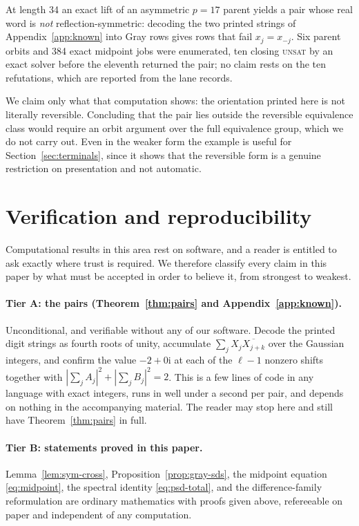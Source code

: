 \documentclass[11pt]{article}
\newcommand{\ii}{\mathrm{i}}
\begin{document}
At length 34 an exact lift of an asymmetric $p=17$ parent yields a pair whose
real word is \emph{not} reflection-symmetric: decoding the two printed strings
of Appendix~\ref{app:known} into Gray rows gives rows that fail $x_j=x_{-j}$.
Six parent orbits and 384 exact midpoint jobs were enumerated, ten closing
\textsc{unsat} by an exact solver before the eleventh returned the pair; no
claim rests on the ten refutations, which are reported from the lane records.

We claim only what that computation shows: the orientation printed here is not
literally reversible.  Concluding that the pair lies outside the reversible
equivalence class would require an orbit argument over the full equivalence
group, which we do not carry out.  Even in the weaker form the example is
useful for Section~\ref{sec:terminals}, since it shows that the reversible
form is a genuine restriction on presentation and not automatic.

\section{Verification and reproducibility}
\label{sec:verification}

Computational results in this area rest on software, and a reader is entitled
to ask exactly where trust is required.  We therefore classify every claim in
this paper by what must be accepted in order to believe it, from strongest to
weakest.

\paragraph{Tier A: the pairs (Theorem~\ref{thm:pairs} and Appendix~\ref{app:known}).}
Unconditional, and verifiable without any of our software.  Decode the printed
digit strings as fourth roots of unity, accumulate
$\sum_j X_j\overline{X_{j+k}}$ over the Gaussian integers, and confirm the
value $-2+0\ii$ at each of the $\ell-1$ nonzero shifts together with
$|\sum_j A_j|^2+|\sum_j B_j|^2=2$.  This is a few lines of code in any
language with exact integers, runs in well under a second per pair, and
depends on nothing in the accompanying material.  The reader may stop here and
still have Theorem~\ref{thm:pairs} in full.

\paragraph{Tier B: statements proved in this paper.}
Lemma~\ref{lem:sym-cross}, Proposition~\ref{prop:gray-sds}, the midpoint
equation \eqref{eq:midpoint}, the spectral identity \eqref{eq:psd-total}, and
the difference-family reformulation are ordinary mathematics with proofs given
above, refereeable on paper and independent of any computation.
\end{document}
